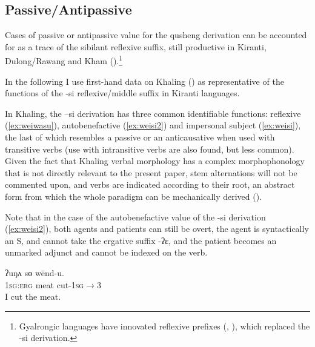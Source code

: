 \documentclass[oldfontcommands,oneside,a4paper,11pt]{article}
\newcommand{\ipa}[1]{{\phon \mbox{#1}}} %
\begin{document}

\subsection{Passive/Antipassive} \label{sec:passive}
Cases of passive or antipassive value for the qusheng derivation can be accounted for as a trace of the sibilant reflexive suffix, still productive in Kiranti, Dulong/Rawang and Kham (\citealt[320]{driem93agreement}).\footnote{Gyalrongic languages have innovated reflexive prefixes (\citealt{jacques10refl}, \citealt[89]{lai13affixale}), which replaced the \ipa{-si} derivation.} 

In the following I use first-hand data on Khaling (\citealt{jacques16si}) as representative of the functions of the \ipa{-si} reflexive/middle suffix in Kiranti languages.



In Khaling, the  \ipa{--si} derivation has three common identifiable functions: reflexive (\ref{ex:weiwasu}), autobenefactive (\ref{ex:weisi2}) and impersonal subject (\ref{ex:weisi}), the last of which resembles a passive or an anticausative when used with transitive verbs (use with intransitive verbs are also found, but less common). Given the fact that Khaling verbal morphology has a complex morphophonology that is not directly relevant to the present paper, stem alternations will not be commented upon, and verbs are indicated according to their root, an abstract form from which the whole paradigm can be mechanically derived (\citealt{jacques12khaling, jacques16si}).

Note that in the case of the autobenefactive value of the \ipa{-si} derivation (\ref{ex:weisi2}), both agents and patients can still be overt, the agent is syntactically an S, and cannot take the ergative suffix \ipa{-ʔɛ}, and the patient becomes an unmarked adjunct and cannot be indexed on the verb.
 
\begin{exe}
\ex \label{ex:wendu} 
\gll 
\ipa{ʔuŋʌ}  	\ipa{sɵ}  	\ipa{wēnd-u.}  \\
\textsc{1sg:erg} meat cut-\textsc{1sg$\rightarrow$3} \\
\glt I cut the meat.
\end{exe}
\end{document}

